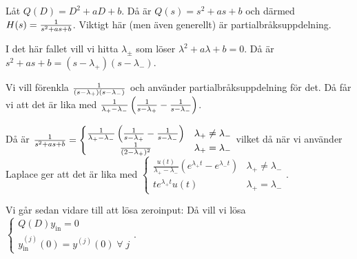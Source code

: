 \documentclass[a4paper]{article}
\begin{document}
\begin{ex}
    Låt \(
        Q(D) = D^2 + aD + b
    \). Då är \(
        Q(s) = s^2 + as + b
    \) och därmed \(
        H(s) = \frac{1}{s^2 + as + b}
    \). Viktigt här (men även generellt) är partialbråksuppdelning.
    
    I det här fallet vill vi hitta \(
        \lambda_{\pm}
    \) som löser \(
        \lambda^2 + a \lambda + b = 0
    \). Då är \(
        s^2 + a s + b = (s-\lambda_+)(s-\lambda_-)
    \).

    Vi vill förenkla \(
        \frac{1}{(s-\lambda_+)(s-\lambda_-)}
    \) och använder partialbråksuppdelning för det. Då får vi att det 
    är lika med \(
        \frac{1}{\lambda_+ - \lambda_-} \left( \frac{1}{s-\lambda_+} - \frac{1}{s-\lambda_-} \right)
    \). 

    Då är \(
        \frac{1}{s^2 + as + b} = \left\{\begin{matrix}
            \frac{1}{\lambda_+ - \lambda_-} \left( \frac{1}{s-\lambda_+} - \frac{1}{s-\lambda_-} \right) & \lambda_+ \neq \lambda_- \\ 
            \frac{1}{(2-\lambda_+)^2} & \lambda_+ = \lambda_-
        \end{matrix}\right.
    \) vilket då när vi använder Laplace ger att det är lika med \(
        \left\{\begin{matrix}
            \frac{u(t)}{\lambda_+ - \lambda_-} \left( e^{\lambda_+ t} - e^{\lambda_- t} \right) & \lambda_+ \neq \lambda_- \\ 
            t e^{\lambda_+ t} u(t) & \lambda_+ = \lambda_-
        \end{matrix}\right.
    \).
\end{ex}

Vi går sedan vidare till att lösa zeroinput: Då vill vi lösa \(
    \left\{\begin{matrix}
        Q(D)y_{\text{in}} = 0 \\
        y_{\text{in}}^{(j)} (0) = y^{(j)}(0) \; \forall \; j
    \end{matrix}\right.
\). 
\end{document}
